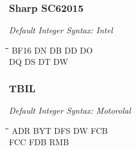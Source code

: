 \subsubsection{Sharp SC62015}

{\em Default Integer Syntax: Intel}

{\tt\begin{tabbing}
\hspace{3cm}\=\hspace{3cm}\=\hspace{3cm}\=\hspace{3cm}\=\kill
BF16       \> DN          \> DB          \> DD          \> DO \\
DQ         \> DS          \> DT          \> DW \\
\end{tabbing}}

\subsubsection{TBIL}

{\em Default Integer Syntax: Motorolal}

{\tt\begin{tabbing}
\hspace{3cm}\=\hspace{3cm}\=\hspace{3cm}\=\hspace{3cm}\=\kill
ADR        \> BYT         \> DFS         \> DW          \> FCB \\
FCC        \> FDB         \> RMB \\
\end{tabbing}}
